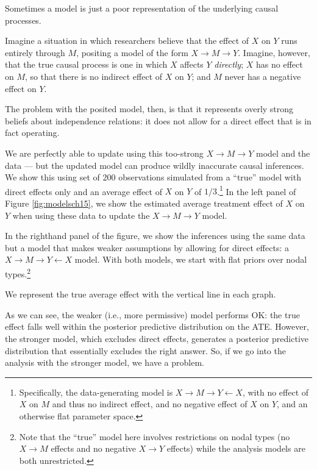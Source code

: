 \documentclass[
  12pt,
]{book}
\begin{document}
Sometimes a model is just a poor representation of the underlying causal processes.

Imagine a situation in which researchers believe that the effect of \(X\) on \(Y\) runs entirely through \(M\), positing a model of the form \(X \rightarrow M \rightarrow Y\). Imagine, however, that the true causal process is one in which \(X\) affects \(Y\) \emph{directly}; \(X\) has no effect on \(M\), so that there is no indirect effect of \(X\) on \(Y\); and \(M\) never has a negative effect on \(Y\).

The problem with the posited model, then, is that it represents overly strong beliefs about independence relations: it does not allow for a direct effect that is in fact operating.

We are perfectly able to update using this too-strong \(X \rightarrow M \rightarrow Y\) model and the data --- but the updated model can produce wildly inaccurate causal inferences. We show this using set of 200 observations simulated from a ``true'' model with direct effects only and an average effect of \(X\) on \(Y\) of \(1/3\).\footnote{Specifically, the data-generating model is \(X \rightarrow M \rightarrow Y \leftarrow X\), with no effect of \(X\) on \(M\) and thus no indirect effect, and no negative effect of \(X\) on \(Y\), and an otherwise flat parameter space.} In the left panel of Figure \ref{fig:modelsch15}, we show the estimated average treatment effect of \(X\) on \(Y\) when using these data to update the \(X \rightarrow M \rightarrow Y\) model.

In the righthand panel of the figure, we show the inferences using the same data but a model that makes weaker assumptions by allowing for direct effects: a \(X \rightarrow M \rightarrow Y \leftarrow X\) model. With both models, we start with flat priors over nodal types.\footnote{Note that the ``true'' model here involves restrictions on nodal types (no \(X \rightarrow M\) effects and no negative \(X \rightarrow Y\) effects) while the analysis models are both unrestricted.}

We represent the true average effect with the vertical line in each graph.

As we can see, the weaker (i.e., more permissive) model performs OK: the true effect falls well within the posterior predictive distribution on the ATE. However, the stronger model, which excludes direct effects, generates a posterior predictive distribution that essentially excludes the right answer. So, if we go into the analysis with the stronger model, we have a problem.
\end{document}
